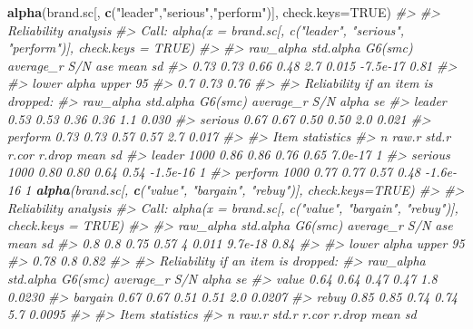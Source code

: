 \documentclass[12pt,]{book}
\newenvironment{Shaded}{\begin{snugshade}}{\end{snugshade}}
\newcommand{\KeywordTok}[1]{\textcolor[rgb]{0.13,0.29,0.53}{\textbf{{#1}}}}
\newcommand{\DataTypeTok}[1]{\textcolor[rgb]{0.13,0.29,0.53}{{#1}}}
\newcommand{\StringTok}[1]{\textcolor[rgb]{0.31,0.60,0.02}{{#1}}}
\newcommand{\CommentTok}[1]{\textcolor[rgb]{0.56,0.35,0.01}{\textit{{#1}}}}
\newcommand{\OtherTok}[1]{\textcolor[rgb]{0.56,0.35,0.01}{{#1}}}
\newcommand{\NormalTok}[1]{{#1}}
\begin{document}
\begin{Shaded}
\begin{Highlighting}[]

\KeywordTok{alpha}\NormalTok{(brand.sc[, }\KeywordTok{c}\NormalTok{(}\StringTok{"leader"}\NormalTok{,}\StringTok{"serious"}\NormalTok{,}\StringTok{"perform"}\NormalTok{)], }\DataTypeTok{check.keys=}\OtherTok{TRUE}\NormalTok{)}
\CommentTok{#> }
\CommentTok{#> Reliability analysis   }
\CommentTok{#> Call: alpha(x = brand.sc[, c("leader", "serious", "perform")], check.keys = TRUE)}
\CommentTok{#> }
\CommentTok{#>   raw_alpha std.alpha G6(smc) average_r S/N   ase     mean   sd}
\CommentTok{#>       0.73      0.73    0.66      0.48 2.7 0.015 -7.5e-17 0.81}
\CommentTok{#> }
\CommentTok{#>  lower alpha upper     95%
\CommentTok{#> 0.7 0.73 0.76 }
\CommentTok{#> }
\CommentTok{#>  Reliability if an item is dropped:}
\CommentTok{#>         raw_alpha std.alpha G6(smc) average_r S/N alpha se}
\CommentTok{#> leader       0.53      0.53    0.36      0.36 1.1    0.030}
\CommentTok{#> serious      0.67      0.67    0.50      0.50 2.0    0.021}
\CommentTok{#> perform      0.73      0.73    0.57      0.57 2.7    0.017}
\CommentTok{#> }
\CommentTok{#>  Item statistics }
\CommentTok{#>            n raw.r std.r r.cor r.drop     mean sd}
\CommentTok{#> leader  1000  0.86  0.86  0.76   0.65  7.0e-17  1}
\CommentTok{#> serious 1000  0.80  0.80  0.64   0.54 -1.5e-16  1}
\CommentTok{#> perform 1000  0.77  0.77  0.57   0.48 -1.6e-16  1}
\KeywordTok{alpha}\NormalTok{(brand.sc[, }\KeywordTok{c}\NormalTok{(}\StringTok{"value"}\NormalTok{, }\StringTok{"bargain"}\NormalTok{, }\StringTok{"rebuy"}\NormalTok{)], }\DataTypeTok{check.keys=}\OtherTok{TRUE}\NormalTok{)}
\CommentTok{#> }
\CommentTok{#> Reliability analysis   }
\CommentTok{#> Call: alpha(x = brand.sc[, c("value", "bargain", "rebuy")], check.keys = TRUE)}
\CommentTok{#> }
\CommentTok{#>   raw_alpha std.alpha G6(smc) average_r S/N   ase    mean   sd}
\CommentTok{#>        0.8       0.8    0.75      0.57   4 0.011 9.7e-18 0.84}
\CommentTok{#> }
\CommentTok{#>  lower alpha upper     95%
\CommentTok{#> 0.78 0.8 0.82 }
\CommentTok{#> }
\CommentTok{#>  Reliability if an item is dropped:}
\CommentTok{#>         raw_alpha std.alpha G6(smc) average_r S/N alpha se}
\CommentTok{#> value        0.64      0.64    0.47      0.47 1.8   0.0230}
\CommentTok{#> bargain      0.67      0.67    0.51      0.51 2.0   0.0207}
\CommentTok{#> rebuy        0.85      0.85    0.74      0.74 5.7   0.0095}
\CommentTok{#> }
\CommentTok{#>  Item statistics }
\CommentTok{#>            n raw.r std.r r.cor r.drop     mean sd}
}}
\end{Highlighting}
\end{Shaded}
\end{document}
